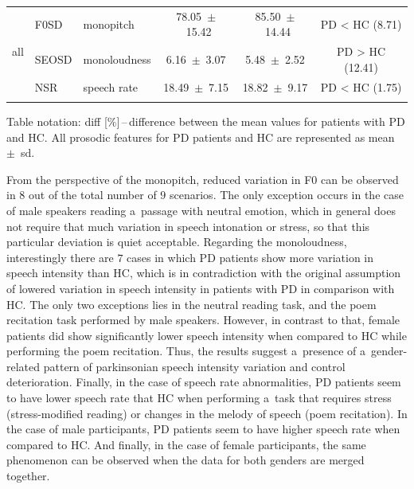 \begin{table}[!htb]
\begin{threeparttable}
\begin{tabular}{l l l c c c}
			\multirow{3}{*}{all} &
			  F0SD  & monopitch    &  78.05~$\pm$~15.42 &  85.50~$\pm$~14.44 & PD < HC (8.71) \\
			& SEOSD & monoloudness &   6.16~$\pm$~3.07  &   5.48~$\pm$~2.52 & PD > HC (12.41) \\
			& NSR 	& speech rate  &  18.49~$\pm$~7.15  &  18.82~$\pm$~9.17 & PD < HC (1.75) \\

			\noalign{\smallskip}\hline\hline
		\end{tabular}
		
		\begin{tablenotes}
			\scriptsize
			\item Table notation: diff [\%]\,--\,difference between the mean values for patients with PD and HC. All prosodic features for PD patients and HC are represented as mean~$\pm$~sd.
		\end{tablenotes}
	\end{threeparttable}
\end{table}

\newpage
From the perspective of the monopitch, reduced variation in F0 can be observed in $8$ out of the total number of $9$ scenarios. The only exception occurs in the case of male speakers reading a~passage with neutral emotion, which in general does not require that much variation in speech intonation or stress, so that this particular deviation is quiet acceptable. Regarding the monoloudness, interestingly there are $7$ cases in which PD patients show more variation in speech intensity than HC, which is in contradiction with the original assumption of lowered variation in speech intensity in patients with PD in comparison with HC. The only two exceptions lies in the neutral reading task, and the poem recitation task performed by male speakers. However, in contrast to that, female patients did show significantly lower speech intensity when compared to HC while performing the poem recitation. Thus, the results suggest a~presence of a~gender-related pattern of parkinsonian speech intensity variation and control deterioration. Finally, in the case of speech rate abnormalities, PD patients seem to have lower speech rate that HC when performing a~task that requires stress (stress-modified reading) or changes in the melody of speech (poem recitation). In the case of male participants, PD patients seem to have higher speech rate when compared to HC. And finally, in the case of female participants, the same phenomenon can be observed when the data for both genders are merged together.


